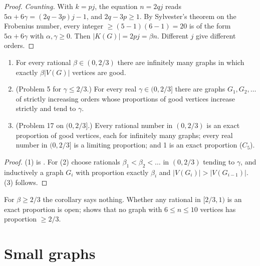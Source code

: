 \documentclass[11pt,a4paper]{report}
\begin{document}
\begin{proof}
\emph{Counting.} With \(k=pj\), the equation \(n=2qj\) reads \(5\alpha+6\gamma=(2q-3p)j-1\), and \(2q-3p\ge1\). By
Sylvester's theorem on the Frobenius number, every integer \(\ge(5-1)(6-1)=20\) is of the form
\(5\alpha+6\gamma\) with \(\alpha,\gamma\ge0\). Then \(|K(G)|=2pj=\beta n\). Different \(j\) give different orders.
\end{proof}

\begin{corollary}\label{cor:problems}
\begin{enumerate}
\item For every rational \(\beta\in(0,2/3)\) there are infinitely many graphs in which exactly \(\beta|V(G)|\) vertices
are good.
\item (Problem 5 for \(\gamma\le2/3\).) For every real \(\gamma\in(0,2/3]\) there are graphs \(G_1,G_2,\dots\) of
strictly increasing orders whose proportions of good vertices increase strictly and tend to \(\gamma\).
\item (Problem 17 on \((0,2/3]\).) Every rational number in \((0,2/3)\) is an exact proportion of good vertices, each
for infinitely many graphs; every real number in \((0,2/3]\) is a limiting proportion; and 1 is an exact proportion
(\(C_5\)).
\end{enumerate}
\end{corollary}
\begin{proof}
(1) is . For (2) choose rationals \(\beta_1<\beta_2<\dots\) in \((0,2/3)\) tending to \(\gamma\), and
inductively a graph \(G_i\) with proportion exactly \(\beta_i\) and \(|V(G_i)|>|V(G_{i-1})|\). (3) follows.
\end{proof}

For \(\beta\ge2/3\) the corollary says nothing. Whether any rational in \([2/3,1)\) is an exact proportion is open;
 shows that no graph with \(6\le n\le10\) vertices has proportion \(\ge2/3\).

\section{Small graphs}\label{sec:small}
\end{document}
